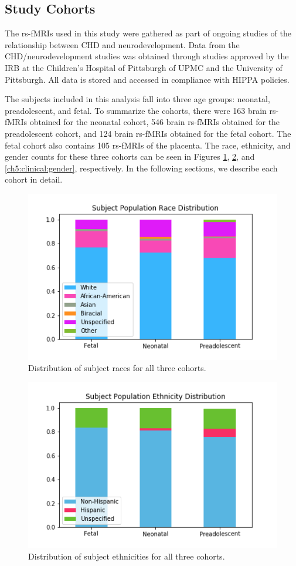 \subsection{Study Cohorts}

The rs-fMRIs used in this study were gathered as part of ongoing studies of the relationship between CHD and neurodevelopment. Data from the CHD/neurodevelopment studies was obtained through studies approved by the IRB at the Children's Hospital of Pittsburgh of UPMC and the University of Pittsburgh. All data is stored and accessed in compliance with HIPPA policies.

The subjects included in this analysis fall into three age groups: neonatal, preadolescent, and fetal. To summarize the cohorts, there were 163 brain rs-fMRIs obtained for the neonatal cohort, 546 brain rs-fMRIs obtained for the preadolescent cohort, and 124 brain rs-fMRIs obtained for the fetal cohort. The fetal cohort also contains 105 rs-fMRIs of the placenta. The race, ethnicity, and gender counts for these three cohorts can be seen in Figures \ref{ch5:clinical:race}, \ref{ch5:clinical:eth}, and \ref{ch5:clinical:gender}, respectively. In the following sections, we describe each cohort in detail. 

\begin{figure}
\centering
\includegraphics[width=.75\textwidth]{5/demo_clinical_subj_race.png}
\caption{Distribution of subject races for all three cohorts.}
\label{ch5:clinical:race}
\end{figure}%
%
\begin{figure}
\centering
\includegraphics[width=.75\textwidth]{5/demo_clinical_subj_ethnicity.png}
\caption{Distribution of subject ethnicities for all three cohorts.}
\label{ch5:clinical:eth}
\end{figure}

